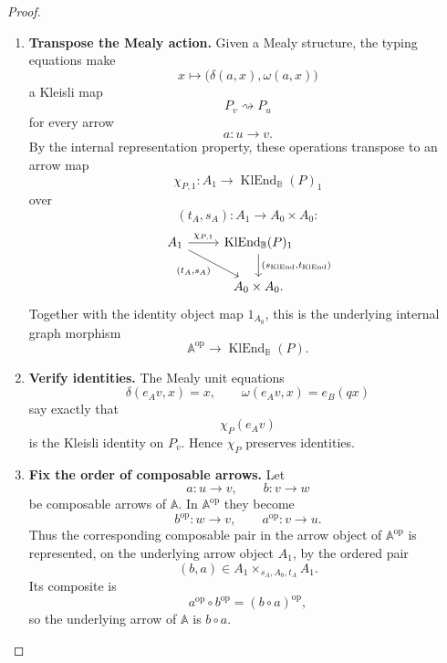 \begin{proof}
    \leavevmode
    \begin{enumerate}
        \item \textbf{Transpose the Mealy action.}
        Given a Mealy structure, the typing equations make
        \[
            x\longmapsto
            \bigl(\delta(a,x),\omega(a,x)\bigr)
        \]
        a Kleisli map
        \[
            P_v\rightsquigarrow P_u
        \]
        for every arrow
        \[
            a:u\to v.
        \]
        By the internal representation property, these operations transpose
        to an arrow map
        \[
            \chi_{P,1}:
            A_1\to
            \operatorname{KlEnd}_{\mathbb B}(P)_1
        \]
        over
        \[
            (t_A,s_A):A_1\to A_0\times A_0:
        \]
        \[
        \begin{tikzcd}
            A_1
                \arrow[r, "\chi_{P,1}"]
                \arrow[dr, "{(t_A,s_A)}"']
            &
            \operatorname{KlEnd}_{\mathbb B}(P)_1
                \arrow[d,
                "{(s_{\operatorname{KlEnd}},
                   t_{\operatorname{KlEnd}})}"]
            \\
            &
            A_0\times A_0.
        \end{tikzcd}
        \]
        Together with the identity object map \(1_{A_0}\), this is the
        underlying internal graph morphism
        \[
            \mathbb A^{\mathrm{op}}
            \to
            \operatorname{KlEnd}_{\mathbb B}(P).
        \]

        \item \textbf{Verify identities.}
        The Mealy unit equations
        \[
            \delta(e_Av,x)=x,
            \qquad
            \omega(e_Av,x)=e_B(qx)
        \]
        say exactly that
        \[
            \chi_P(e_Av)
        \]
        is the Kleisli identity on \(P_v\). Hence \(\chi_P\) preserves
        identities.

        \item \textbf{Fix the order of composable arrows.}
        Let
        \[
            a:u\to v,
            \qquad
            b:v\to w
        \]
        be composable arrows of \(\mathbb A\). In
        \(\mathbb A^{\mathrm{op}}\) they become
        \[
            b^{\mathrm{op}}:w\to v,
            \qquad
            a^{\mathrm{op}}:v\to u.
        \]
        Thus the corresponding composable pair in the arrow object of
        \(\mathbb A^{\mathrm{op}}\) is represented, on the underlying arrow
        object \(A_1\), by the ordered pair
        \[
            (b,a)
            \in
            A_1\times_{s_A,A_0,t_A}A_1.
        \]
        Its composite is
        \[
            a^{\mathrm{op}}\circ b^{\mathrm{op}}
            =
            (b\circ a)^{\mathrm{op}},
        \]
        so the underlying arrow of \(\mathbb A\) is \(b\circ a\).


\end{enumerate}
\end{proof}
